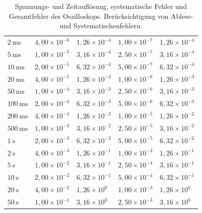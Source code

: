 \begin{table}[h!]
\begin{tabular}{l|l|l|l||l}
    \(2~\text{ms}\) & \(4,00\times 10^{-6}\) & \(1,26\times 10^{-4}\) & \(1,00\times 10^{-7}\) & \(1,26\times 10^{-4}\) \\
    \(5~\text{ms}\) & \(1,00\times 10^{-5}\) & \(3,16\times 10^{-4}\) & \(2,50\times 10^{-7}\) & \(3,16\times 10^{-4}\) \\
    \(10~\text{ms}\) & \(2,00\times 10^{-5}\) & \(6,32\times 10^{-4}\) & \(5,00\times 10^{-7}\) & \(6,32\times 10^{-4}\) \\
    \(20~\text{ms}\) & \(4,00\times 10^{-5}\) & \(1,26\times 10^{-3}\) & \(1,00\times 10^{-6}\) & \(1,26\times 10^{-3}\) \\
    \(50~\text{ms}\) & \(1,00\times 10^{-4}\) & \(3,16\times 10^{-3}\) & \(2,50\times 10^{-6}\) & \(3,16\times 10^{-3}\) \\
    \(100~\text{ms}\) & \(2,00\times 10^{-4}\) & \(6,32\times 10^{-3}\) & \(5,00\times 10^{-6}\) & \(6,32\times 10^{-3}\) \\
    \(200~\text{ms}\) & \(4,00\times 10^{-4}\) & \(1,26\times 10^{-2}\) & \(1,00\times 10^{-5}\) & \(1,26\times 10^{-2}\) \\
    \(500~\text{ms}\) & \(1,00\times 10^{-3}\) & \(3,16\times 10^{-2}\) & \(2,50\times 10^{-5}\) & \(3,16\times 10^{-2}\) \\
    \(1~\text{s}\) & \(2,00\times 10^{-3}\) & \(6,32\times 10^{-2}\) & \(5,00\times 10^{-5}\) & \(6,32\times 10^{-2}\) \\
    \(2~\text{s}\) & \(4,00\times 10^{-3}\) & \(1,26\times 10^{-1}\) & \(1,00\times 10^{-4}\) & \(1,26\times 10^{-1}\) \\
    \(5~\text{s}\) & \(1,00\times 10^{-2}\) & \(3,16\times 10^{-1}\) & \(2,50\times 10^{-4}\) & \(3,16\times 10^{-1}\) \\
    \(10~\text{s}\) & \(2,00\times 10^{-2}\) & \(6,32\times 10^{-1}\) & \(5,00\times 10^{-4}\) & \(6,32\times 10^{-1}\) \\
    \(20~\text{s}\) & \(4,00\times 10^{-2}\) & \(1,26\times 10^{0}\) & \(1,00\times 10^{-3}\) & \(1,26\times 10^{0}\) \\
    \(50~\text{s}\) & \(1,00\times 10^{-1}\) & \(3,16\times 10^{0}\) & \(2,50\times 10^{-3}\) & \(3,16\times 10^{0}\) \\
    \bottomrule
    \end{tabular}
    \caption{Spannungs- und Zeitauflösung, systematische Fehler und Gesamtfehler des Oszilloskops. Berücksichtigung von Ablese- und Systematischenfehlern.}
    \label{tab:all_fehler}
\end{table}
\twocolumn





